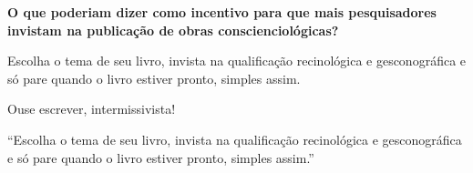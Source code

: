 \documentclass{gescons}
\begin{document}
\begin{multicols}{2}
\textbf{O que poderiam dizer como incentivo para que mais pesquisadores invistam na publicação de obras conscienciológicas?}

Escolha o tema de seu livro, invista na qualificação recinológica e gesconográfica e só pare quando o livro estiver pronto, simples assim. 

Ouse escrever, intermissivista!

\begin{pullquote}
``Escolha o tema de seu livro, invista na qualificação recinológica e gesconográfica e só pare quando o livro estiver pronto, simples assim.''
\end{pullquote}



    
    \end{multicols}
\end{document}
